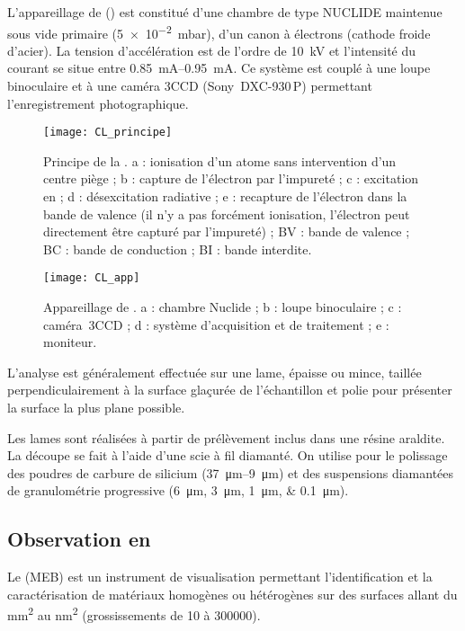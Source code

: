 L'appareillage de \CL () est constitué d'une chambre 
de type NUCLIDE maintenue sous vide primaire (\SI{5e-2}{\milli\bar}), 
d'un canon à électrons (cathode froide d'acier). La tension 
d'accélération est de l'ordre de \SI{10}{\kV} et l'intensité du 
courant se situe entre \SIrange[range-phrase=\ et\ ]{0.85}{0.95}{\mA}. 
Ce système est couplé à une loupe binoculaire et à une caméra 3CCD 
(Sony~DXC-930\,P) permettant l'enregistrement photographique.

\begin{figure}[htb]
  \texttt{[image: CL\_principe]}
  \caption[Principe de la \CL]{Principe de la \CL. 
a : ionisation d'un atome sans intervention d'un centre piège ;
b : capture de l'électron par l'impureté  ;
c : excitation en  ;
d : désexcitation radiative ;
e : recapture de l'électron dans la bande de valence (il n'y a pas 
forcément ionisation, l'électron peut directement être capturé par 
l'impureté) ;
BV : bande de valence ;
BC : bande de conduction ;
BI : bande interdite.
\autocite{web_CL}}
  \label{fig:CL_principe}
\end{figure}

\begin{figure}
  \texttt{[image: CL\_app]}
  \caption{Appareillage de \CL.
           a : chambre Nuclide ;
           b : loupe binoculaire ;
           c : caméra~3CCD ;
           d : système d'acquisition et de traitement ;
           e : moniteur.}
  \label{fig:CL_app}
\end{figure}

L'analyse est généralement effectuée sur une lame, épaisse ou mince, 
taillée perpendiculairement à la surface glaçurée de l'échantillon et 
polie pour présenter la surface la plus plane possible.

Les lames sont réalisées à partir de prélèvement inclus dans une 
résine araldite. La découpe se fait à l'aide d'une scie à fil 
diamanté. On utilise pour le polissage des poudres de carbure 
de silicium (\SIrange[range-phrase=\ et\ ]{37}{9}{\um}) et des
suspensions diamantées de granulométrie progressive 
(\SIlist{6;3;1;0.1}{\um}).

\subsection{Observation en \MEB[ie]}
Le \MEB (MEB) est un instrument de visualisation permettant 
l'identification et la caractérisation de matériaux homogènes 
ou hétérogènes sur des surfaces allant du \si{\mm\squared} au
\si{\nm\squared} (grossissements de \texttimes\num{10} à 
\texttimes\num{300000}).

